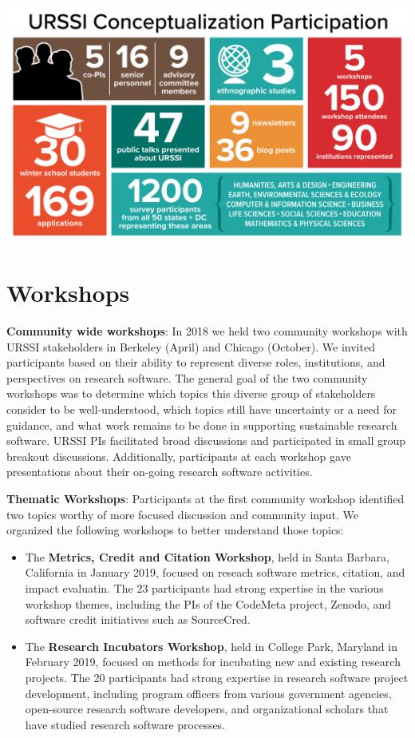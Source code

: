 \documentclass[
]{book}
\begin{document}
\href{https://plan.urssi.us/images/conceptualization_activities.jpg}{\includegraphics{images/conceptualization_activities.jpg}}

\hypertarget{workshops}{%
\section{Workshops}\label{workshops}}

\textbf{Community wide workshops}: In 2018 we held two community workshops with
URSSI stakeholders in Berkeley (April) and Chicago (October). We invited participants
based on their ability to represent diverse roles, institutions, and
perspectives on research software. The general goal of the two community workshops
was to determine which topics this diverse group of stakeholders consider to be
well-understood, which topics still have uncertainty or a need for guidance, and what work
remains to be done in supporting sustainable research software. URSSI PIs
facilitated broad discussions and participated in small group breakout
discussions. Additionally, participants at each workshop gave presentations
about their on-going research software activities.

\textbf{Thematic Workshops}: Participants at the first community workshop identified
two topics worthy of more focused discussion and community input.
We organized the following workshops to better understand those topics:

\begin{itemize}
\item
  The \textbf{Metrics, Credit and Citation Workshop}, held in Santa Barbara,
  California in January 2019, focused on reseach software metrics, citation,
  and impact evaluatin. The 23 participants had strong expertise in the
  various workshop themes, including the PIs of the CodeMeta project, Zenodo,
  and software credit initiatives such as SourceCred.
\item
  The \textbf{Research Incubators Workshop}, held in College Park, Maryland
  in February 2019, focused on methods for incubating new and existing research projects.
  The 20 participants had strong expertise in
  research software project development, including program officers from
  various government agencies, open-source research software developers,
  and organizational scholars that have studied research software processes.
\end{itemize}
\end{document}
